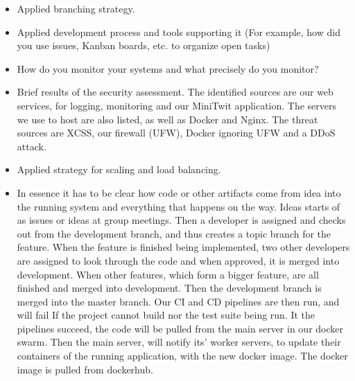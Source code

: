   
  \begin{itemize}

  \item Applied branching strategy.
  \item Applied development process and tools supporting it (For example, how did you use issues, Kanban boards, etc. to organize open tasks)
  \item How do you monitor your systems and what precisely do you monitor?
  \item Brief results of the security assessment.
        The identified sources are our web services, for logging, monitoring and our MiniTwit application.
        The servers we use to host are also listed, as well as Docker and Nginx.
        The threat sources are XCSS, our firewall (UFW), Docker ignoring UFW and a DDoS attack.
        
  \item Applied strategy for scaling and load balancing.
  \item In essence it has to be clear how code or other artifacts come from idea into the running system and everything that happens on the way.
        Ideas starts of as issues or ideas at group meetings.
        Then a developer is assigned and checks out from the development branch,
        and thus creates a topic branch for the feature.
        When the feature is finished being implemented, 
        two other developers are assigned to look through
        the code and when approved, it is merged into development.
        When other features, which form a bigger feature, are all finished and merged into development.
        Then the development branch is merged into the master branch.
        Our CI and CD pipelines are then run, and will fail 
        If the project cannot build nor the test suite being run.
        It the pipelines succeed, the code will be pulled from 
        the main server in our docker swarm.
        Then the main server, will notify its' worker servers,
        to update their containers of the running application,
        with the new docker image. The docker image is pulled from dockerhub.
        
  
\end{itemize}